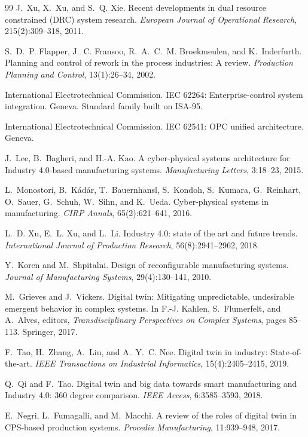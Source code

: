 \begin{thebibliography}{99}
J.~Xu, X.~Xu, and S.~Q. Xie.
Recent developments in dual resource constrained ({DRC}) system research.
\emph{European Journal of Operational Research}, 215(2):309--318, 2011.

S.~D.~P. Flapper, J.~C. Fransoo, R.~A.~C.~M. Broekmeulen, and K.~Inderfurth.
Planning and control of rework in the process industries: A review.
\emph{Production Planning and Control}, 13(1):26--34, 2002.

International Electrotechnical Commission.
IEC 62264: Enterprise-control system integration.
Geneva. Standard family built on ISA-95.

International Electrotechnical Commission.
IEC 62541: OPC unified architecture.
Geneva.

J.~Lee, B.~Bagheri, and H.-A. Kao.
A cyber-physical systems architecture for {I}ndustry 4.0-based manufacturing systems.
\emph{Manufacturing Letters}, 3:18--23, 2015.

L.~Monostori, B.~K\'ad\'ar, T.~Bauernhansl, S.~Kondoh, S.~Kumara, G.~Reinhart, O.~Sauer, G.~Schuh, W.~Sihn, and K.~Ueda.
Cyber-physical systems in manufacturing.
\emph{CIRP Annals}, 65(2):621--641, 2016.

L.~D. Xu, E.~L. Xu, and L.~Li.
Industry 4.0: state of the art and future trends.
\emph{International Journal of Production Research}, 56(8):2941--2962, 2018.

Y.~Koren and M.~Shpitalni.
Design of reconfigurable manufacturing systems.
\emph{Journal of Manufacturing Systems}, 29(4):130--141, 2010.

M.~Grieves and J.~Vickers.
Digital twin: Mitigating unpredictable, undesirable emergent behavior in complex systems.
In F.-J. Kahlen, S.~Flumerfelt, and A.~Alves, editors, \emph{Transdisciplinary Perspectives on Complex Systems}, pages 85--113. Springer, 2017.

F.~Tao, H.~Zhang, A.~Liu, and A.~Y.~C. Nee.
Digital twin in industry: State-of-the-art.
\emph{IEEE Transactions on Industrial Informatics}, 15(4):2405--2415, 2019.

Q.~Qi and F.~Tao.
Digital twin and big data towards smart manufacturing and {I}ndustry 4.0: 360 degree comparison.
\emph{IEEE Access}, 6:3585--3593, 2018.

E.~Negri, L.~Fumagalli, and M.~Macchi.
A review of the roles of digital twin in {CPS}-based production systems.
\emph{Procedia Manufacturing}, 11:939--948, 2017.


\end{thebibliography}
